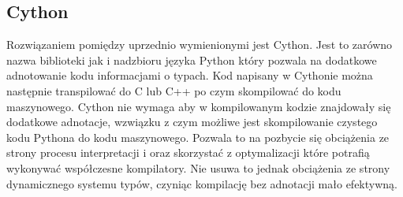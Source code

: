 \documentclass[12pt,a4paper]{article}
\begin{document}
\begin{sloppypar}
    \subsection{Cython}

    Rozwiązaniem pomiędzy uprzednio wymienionymi jest Cython. Jest to zarówno nazwa
    biblioteki jak i nadzbioru języka Python który pozwala na dodatkowe adnotowanie kodu
    informacjami o typach. Kod napisany w Cythonie można następnie transpilować do C
    lub C++ po czym skompilować do kodu maszynowego. Cython nie wymaga aby w
    kompilowanym kodzie znajdowały się dodatkowe adnotacje, wzwiązku z czym możliwe jest
    skompilowanie czystego kodu Pythona do kodu maszynowego. Pozwala to na pozbycie się
    obciążenia ze strony procesu interpretacji i oraz skorzystać z optymalizacji które
    potrafią wykonywać współczesne kompilatory. Nie usuwa to jednak obciążenia ze strony
    dynamicznego systemu typów, czyniąc kompilację bez adnotacji mało efektywną.

    \subsection{}

\end{sloppypar}

\newpage
\begin{sloppypar}
    \medskip

    \printbibliography[
        heading=bibintoc,
        title={Źródła}
    ]

\end{sloppypar}
\end{document}
